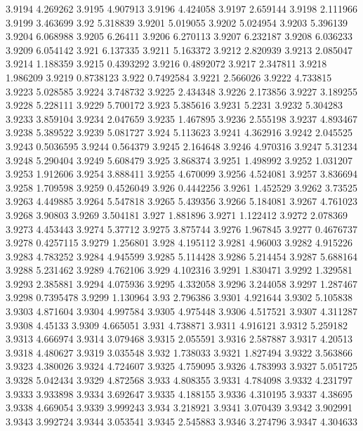 3.9194  4.269262
3.9195  4.907913
3.9196  4.424058
3.9197  2.659144
3.9198  2.111966
3.9199  3.463699
3.92  5.318839
3.9201  5.019055
3.9202  5.024954
3.9203  5.396139
3.9204  6.068988
3.9205  6.26411
3.9206  6.270113
3.9207  6.232187
3.9208  6.036233
3.9209  6.054142
3.921  6.137335
3.9211  5.163372
3.9212  2.820939
3.9213  2.085047
3.9214  1.188359
3.9215  0.4393292
3.9216  0.4892072
3.9217  2.347811
3.9218  1.986209
3.9219  0.8738123
3.922  0.7492584
3.9221  2.566026
3.9222  4.733815
3.9223  5.028585
3.9224  3.748732
3.9225  2.434348
3.9226  2.173856
3.9227  3.189255
3.9228  5.228111
3.9229  5.700172
3.923  5.385616
3.9231  5.2231
3.9232  5.304283
3.9233  3.859104
3.9234  2.047659
3.9235  1.467895
3.9236  2.555198
3.9237  4.893467
3.9238  5.389522
3.9239  5.081727
3.924  5.113623
3.9241  4.362916
3.9242  2.045525
3.9243  0.5036595
3.9244  0.564379
3.9245  2.164648
3.9246  4.970316
3.9247  5.31234
3.9248  5.290404
3.9249  5.608479
3.925  3.868374
3.9251  1.498992
3.9252  1.031207
3.9253  1.912606
3.9254  3.888411
3.9255  4.670099
3.9256  4.524081
3.9257  3.836694
3.9258  1.709598
3.9259  0.4526049
3.926  0.4442256
3.9261  1.452529
3.9262  3.73525
3.9263  4.449885
3.9264  5.547818
3.9265  5.439356
3.9266  5.184081
3.9267  4.761023
3.9268  3.90803
3.9269  3.504181
3.927  1.881896
3.9271  1.122412
3.9272  2.078369
3.9273  4.453443
3.9274  5.37712
3.9275  3.875744
3.9276  1.967845
3.9277  0.4676737
3.9278  0.4257115
3.9279  1.256801
3.928  4.195112
3.9281  4.96003
3.9282  4.915226
3.9283  4.783252
3.9284  4.945599
3.9285  5.114428
3.9286  5.214454
3.9287  5.688164
3.9288  5.231462
3.9289  4.762106
3.929  4.102316
3.9291  1.830471
3.9292  1.329581
3.9293  2.385881
3.9294  4.075936
3.9295  4.332058
3.9296  3.244058
3.9297  1.287467
3.9298  0.7395478
3.9299  1.130964
3.93  2.796386
3.9301  4.921644
3.9302  5.105838
3.9303  4.871604
3.9304  4.997584
3.9305  4.975448
3.9306  4.517521
3.9307  4.311287
3.9308  4.45133
3.9309  4.665051
3.931  4.738871
3.9311  4.916121
3.9312  5.259182
3.9313  4.666974
3.9314  3.079468
3.9315  2.055591
3.9316  2.587887
3.9317  4.20513
3.9318  4.480627
3.9319  3.035548
3.932  1.738033
3.9321  1.827494
3.9322  3.563866
3.9323  4.380026
3.9324  4.724607
3.9325  4.759095
3.9326  4.783993
3.9327  5.051725
3.9328  5.042434
3.9329  4.872568
3.933  4.808355
3.9331  4.784098
3.9332  4.231797
3.9333  3.933898
3.9334  3.692647
3.9335  4.188155
3.9336  4.310195
3.9337  4.38695
3.9338  4.669054
3.9339  3.999243
3.934  3.218921
3.9341  3.070439
3.9342  3.902991
3.9343  3.992724
3.9344  3.053541
3.9345  2.545883
3.9346  3.274796
3.9347  4.304633
